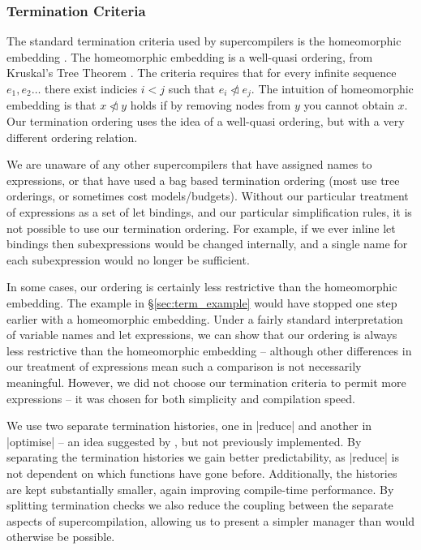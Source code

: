 \documentclass[draft]{sigplanconf}
\begin{document}
\subsubsection{Termination Criteria}

The standard termination criteria used by supercompilers is the homeomorphic embedding \cite{leuschel:homeomorphic}. The homeomorphic embedding is a well-quasi ordering, from Kruskal's Tree Theorem \cite{kruskal:tree}. The criteria requires that for every infinite sequence $e_1,e_2 \ldots$ there exist indicies $i < j$ such that $e_i \ntriangleleft e_j$. The intuition of homeomorphic embedding is that $x \ntriangleleft y$ holds if by removing nodes from $y$ you cannot obtain $x$. Our termination ordering uses the idea of a well-quasi ordering, but with a very different ordering relation.

We are unaware of any other supercompilers that have assigned names to expressions, or that have used a bag based termination ordering (most use tree orderings, or sometimes cost models/budgets). Without our particular treatment of expressions as a set of let bindings, and our particular simplification rules, it is not possible to use our termination ordering. For example, if we ever inline let bindings then subexpressions would be changed internally, and a single name for each subexpression would no longer be sufficient.

In some cases, our ordering is certainly less restrictive than the homeomorphic embedding. The example in \S\ref{sec:term_example} would have stopped one step earlier with a homeomorphic embedding. Under a fairly standard interpretation of variable names and let expressions, we can show that our ordering is always less restrictive than the homeomorphic embedding -- although other differences in our treatment of expressions mean such a comparison is not necessarily meaningful. However, we did not choose our termination criteria to permit more expressions -- it was chosen for both simplicity and compilation speed.

We use two separate termination histories, one in |reduce| and another in |optimise| -- an idea suggested by \citet{me:thesis}, but not previously implemented. By separating the termination histories we gain better predictability, as |reduce| is not dependent on which functions have gone before. Additionally, the histories are kept substantially smaller, again improving compile-time performance. By splitting termination checks we also reduce the coupling between the separate aspects of supercompilation, allowing us to present a simpler manager than would otherwise be possible.
\end{document}
